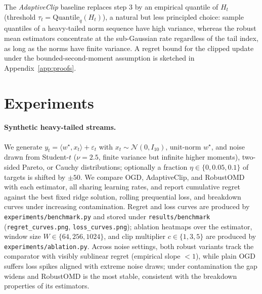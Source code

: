 \documentclass[11pt]{article}
\newcommand{\ip}[2]{\langle #1, #2 \rangle}
\begin{document}
The \emph{AdaptiveClip} baseline replaces step 3 by an empirical quantile of $H_t$
(threshold $\tau_t = \mathrm{Quantile}_q(H_t)$), a natural but less principled choice:
sample quantiles of a heavy-tailed norm sequence have high variance, whereas the robust
mean estimators concentrate at the sub-Gaussian rate regardless of the tail index, as
long as the norms have finite variance. A regret bound for the clipped update under the
bounded-second-moment assumption is sketched in Appendix~\ref{app:proofs}.

\section{Experiments}

\paragraph{Synthetic heavy-tailed streams.} We generate $y_t = \ip{w^\star}{x_t} +
\varepsilon_t$ with $x_t \sim \mathcal{N}(0, I_{10})$, unit-norm $w^\star$, and noise
drawn from Student-$t$ ($\nu = 2.5$, finite variance but infinite higher moments),
two-sided Pareto, or Cauchy distributions; optionally a fraction
$\eta \in \{0, 0.05, 0.1\}$ of targets is shifted by $\pm 50$. We compare OGD,
AdaptiveClip, and RobustOMD with each estimator, all sharing learning rates, and report
cumulative regret against the best fixed ridge solution, rolling prequential loss, and
breakdown curves under increasing contamination. Regret and loss curves are produced by
\texttt{experiments/benchmark.py} and stored under \texttt{results/benchmark}
(\texttt{regret\_curves.png}, \texttt{loss\_curves.png}); ablation heatmaps over the
estimator, window size $W \in \{64, 256, 1024\}$, and clip multiplier
$c \in \{1, 3, 5\}$ are produced by \texttt{experiments/ablation.py}. Across noise
settings, both robust variants track the comparator with visibly sublinear regret
(empirical slope $< 1$), while plain OGD suffers loss spikes aligned with extreme noise
draws; under contamination the gap widens and RobustOMD is the most stable, consistent
with the breakdown properties of its estimators.
\end{document}

